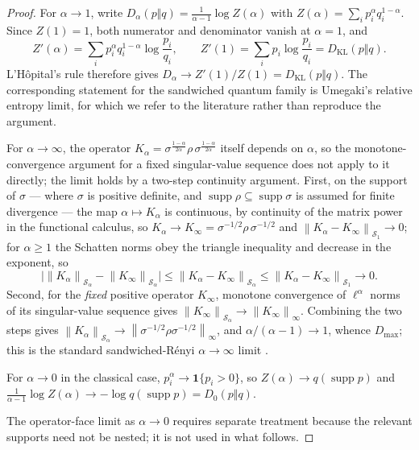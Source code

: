 \documentclass[12pt]{article}
\theoremstyle{definition}
\DeclareMathOperator{\supp}{supp}
\newcommand{\norm}[1]{\left\lVert#1\right\rVert}
\newcommand{\Sp}[1]{\mathcal S_{#1}}
\newcommand{\KL}{D_{\mathrm{KL}}}
\newcommand{\Dmax}{D_{\max}}
\begin{document}
\begin{proof}
For $\alpha\to1$, write
$D_\alpha(p\Vert q)=\frac{1}{\alpha-1}\log Z(\alpha)$ with
$Z(\alpha)=\sum_ip_i^\alpha q_i^{1-\alpha}$.  Since $Z(1)=1$, both numerator
and denominator vanish at $\alpha=1$, and
\[
Z'(\alpha)=\sum_ip_i^\alpha q_i^{1-\alpha}\log\frac{p_i}{q_i},
\qquad
Z'(1)=\sum_ip_i\log\frac{p_i}{q_i}=\KL(p\Vert q).
\]
L'H\^opital's rule therefore gives
$D_\alpha\to Z'(1)/Z(1)=\KL(p\Vert q)$.  The corresponding statement for the
sandwiched quantum family is Umegaki's relative entropy limit, for which we
refer to the literature rather than reproduce the argument.

For $\alpha\to\infty$, the operator
$K_\alpha=\sigma^{\frac{1-\alpha}{2\alpha}}\rho\,
\sigma^{\frac{1-\alpha}{2\alpha}}$ itself depends on $\alpha$, so the
monotone-convergence argument for a fixed singular-value sequence does not
apply to it directly; the limit holds by a two-step continuity argument.
First, on the support of $\sigma$ --- where $\sigma$ is positive definite,
and $\supp\rho\subseteq\supp\sigma$ is assumed for finite divergence ---
the map $\alpha\mapsto K_\alpha$ is continuous, by continuity of the matrix
power in the functional calculus, so
$K_\alpha\to K_\infty=\sigma^{-1/2}\rho\,\sigma^{-1/2}$ and
$\norm{K_\alpha-K_\infty}_{\Sp{1}}\to0$; for $\alpha\ge1$ the Schatten
norms obey the triangle inequality and decrease in the exponent, so
\[
\bigl|
\norm{K_\alpha}_{\Sp{\alpha}}-\norm{K_\infty}_{\Sp{\alpha}}
\bigr|
\le
\norm{K_\alpha-K_\infty}_{\Sp{\alpha}}
\le
\norm{K_\alpha-K_\infty}_{\Sp{1}}
\to
0 .
\]
Second, for the \emph{fixed} positive operator $K_\infty$, monotone
convergence of $\ell^\alpha$ norms of its singular-value sequence gives
$\norm{K_\infty}_{\Sp{\alpha}}\to\norm{K_\infty}_\infty$.  Combining the
two steps gives
$\norm{K_\alpha}_{\Sp{\alpha}}\to\norm{\sigma^{-1/2}\rho\sigma^{-1/2}}_\infty$,
and $\alpha/(\alpha-1)\to1$, whence $\Dmax$; this is the standard
sandwiched-R\'enyi $\alpha\to\infty$ limit
\cite{mullerlennert2013,franklieb2013}.

For $\alpha\to0$ in the classical case, $p_i^\alpha\to\mathbf 1\{p_i>0\}$, so
$Z(\alpha)\to q(\supp p)$ and
$\frac{1}{\alpha-1}\log Z(\alpha)\to-\log q(\supp p)=D_0(p\Vert q)$.

The operator-face limit as $\alpha\to0$ requires separate treatment because
the relevant supports need not be nested; it is not used in what follows.
\end{proof}

\end{document}
